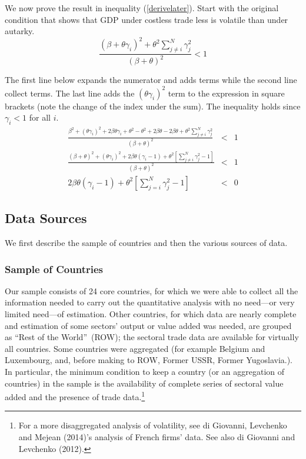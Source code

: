 \documentclass[12pt]{article}
\begin{document}
We now prove the result in inequality (\ref{derivelater}). Start with the
original condition that shows that GDP under costless trade less is volatile
than under autarky. 
\begin{equation*}
\frac{\left( \beta +\theta \gamma _{i}\right) ^{2}+\theta ^{2}\sum_{j\neq
i}^{N}\gamma _{j}^{2}}{\left( \beta +\theta \right) ^{2}}<1
\end{equation*}

The first line below expands the numerator and adds terms while the second
line collect terms. The last line adds the $\left( \theta \gamma
_{i}\right)^{2}$ term to the expression in square brackets (note the change
of the index under the sum). The inequality holds since $\gamma _{i}<1$ for
all $i$. 
\begin{eqnarray*}
\frac{\beta ^{2}+\left( \theta \gamma _{i}\right) ^{2}+2\beta \theta
\gamma_{i}+\theta ^{2}-\theta ^{2}+2\beta \theta -2\beta \theta
+\theta^{2}\sum_{j\neq i}^{N}\gamma _{j}^{2}}{\left( \beta +\theta \right)
^{2}}&<&1 \\
\frac{\left( \beta +\theta \right) ^{2}+\left( \theta \gamma
_{i}\right)^{2}+2\beta \theta (\gamma _{i}-1)+\theta ^{2}\left[ \sum_{j\neq
i}^{N}\gamma _{j}^{2}-1\right] }{\left( \beta +\theta \right) ^{2}} &<&1 \\
2\beta \theta (\gamma _{i}-1)+\theta ^{2}\left[ \sum_{j=i}^{N}%
\gamma_{j}^{2}-1\right] &<&0
\end{eqnarray*}

\subsection{Data Sources}

We first describe the sample of countries and then the various sources of
data.

\subsubsection{Sample of Countries}

Our sample consists of 24 core countries, for which we were able to collect
all the information needed to carry out the quantitative analysis with no
need---or very limited need---of estimation. Other countries, for which data
are nearly complete and estimation of some sectors' output or value added
was needed, are grouped as \textquotedblleft Rest of the
World\textquotedblright\ (ROW); the sectoral trade data are available for
virtually all countries. Some countries were aggregated (for example Belgium
and Luxembourg, and, before making to ROW, Former USSR, Former Yugoslavia.).
In particular, the minimum condition to keep a country (or an aggregation of
countries) in the sample is the availability of complete series of sectoral
value added and the presence of trade data.\footnote{%
For a more disaggregated analysis of volatility, see di Giovanni, Levchenko
and Mejean (2014)'s analysis of French firms' data. See also di Giovanni and
Levchenko (2012).}
\end{document}
